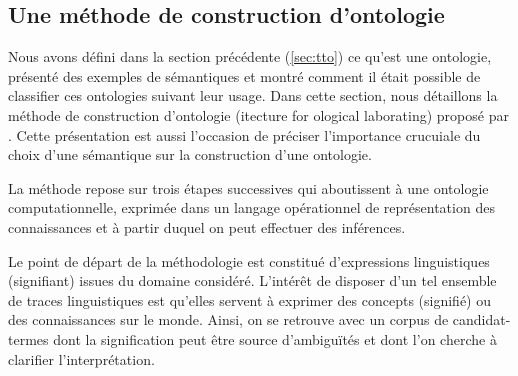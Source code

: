 \subsection{Une méthode de construction d'ontologie}\label{chap:construction}
Nous avons défini dans la section précédente (\ref{sec:tto}) ce qu'est une ontologie,  présenté des exemples de sémantiques et montré comment il était possible de classifier ces ontologies suivant leur usage. 
Dans cette section, nous détaillons la méthode de construction d'ontologie  (itecture for ological laborating) proposé par \cite{Bachimont2000a}.
Cette présentation est aussi l'occasion de préciser l'importance crucuiale du choix d'une sémantique sur la construction d'une ontologie.

La méthode repose sur trois étapes successives qui aboutissent à une ontologie computationnelle, exprimée dans un langage opérationnel de représentation des connaissances et à partir duquel on peut effectuer des inférences. 
\begin{liste}
	\item Le point de départ de la méthodologie est constitué d'expressions linguistiques (signifiant) issues du domaine considéré.
	L'intérêt de disposer d'un tel ensemble de traces linguistiques est qu'elles servent à exprimer des concepts (signifié) ou des connaissances sur le monde. 
	Ainsi, on se retrouve avec un corpus de candidat-termes dont la signification peut être source d'ambiguïtés et dont l'on cherche à clarifier l'interprétation.
\end{liste}
